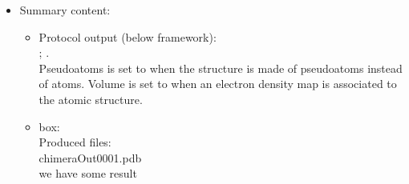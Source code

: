 \begin{itemize}
   \item Summary content:\\
    \begin{itemize}
     \item Protocol output (below \scipion framework):\\ ; .\\Pseudoatoms is set to  when the structure is made of pseudoatoms instead of atoms. Volume is set to  when an electron density map is associated to the atomic structure.\\
     \item {} box:\\Produced files:\\chimeraOut0001.pdb\\we have some result\\
    \end{itemize}
  
  \end{itemize}
